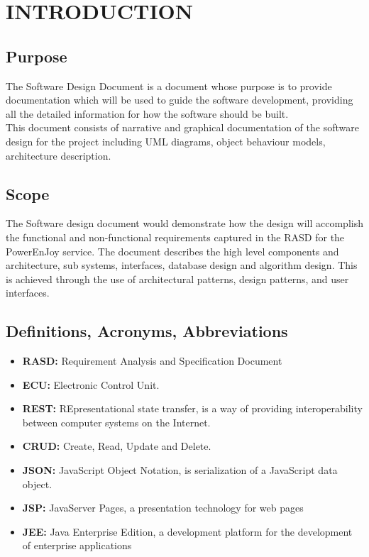 \section{INTRODUCTION}
\subsection{Purpose}
The Software Design Document is a document whose purpose is to provide documentation which will be used to guide the software development, providing all the detailed information for how the software should be built.\\
This document consists of  narrative and graphical documentation of the software design for the project including UML diagrams, object behaviour models, architecture description.
\subsection{Scope}
The Software design document would demonstrate how the design will accomplish the functional and non-functional requirements captured in the RASD for the PowerEnJoy service.
The document describes the high level components and architecture, sub systems, interfaces, database design and algorithm design. This is achieved through the use of architectural patterns, design patterns, and user interfaces. 
\subsection{Definitions, Acronyms, Abbreviations}
\begin{itemize}
	\item \textbf{RASD:} Requirement Analysis and Specification Document
	\item \textbf{ECU:} Electronic Control Unit. 
	\item \textbf{REST:} REpresentational state transfer, is a way of providing interoperability between computer systems on the Internet.
	\item \textbf{CRUD:} Create, Read, Update and Delete.
	\item \textbf{JSON:} JavaScript Object Notation, is serialization of a JavaScript data object.
	\item \textbf{JSP:} JavaServer Pages, a presentation technology for web pages
	\item \textbf{JEE:} Java Enterprise Edition, a development platform for the development of enterprise applications

\end{itemize}
